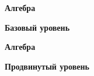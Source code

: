 \hspace{3mm}

\centerline{\bf \Huge Алгебра}

\centerline{\bf \large Базовый уровень}

\begin{flushright}
        \scriptsize{}
\end{flushright}











\newpage

\hspace{3mm}

\centerline{\bf \Huge Алгебра}

\centerline{\bf \large Продвинутый уровень}

\begin{flushright}
        \scriptsize{}
\end{flushright}





